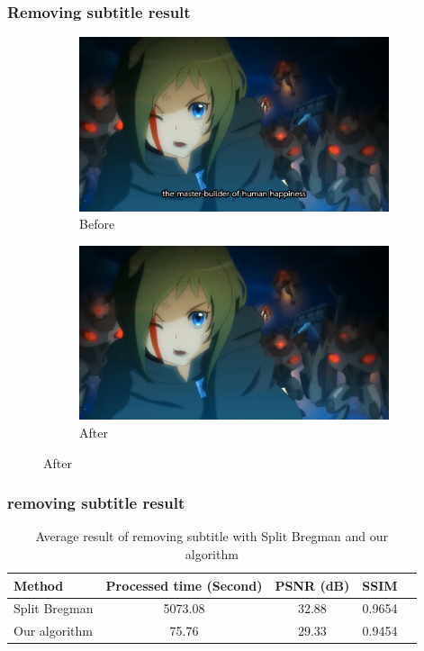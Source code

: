 \documentclass[xcolor=dvipsnames, xetex,serif]{beamer}
\begin{document}
    \begin{frame}
        \frametitle{Removing subtitle result}
        \begin{figure}[H]
            \centering
            \begin{subfigure}{0.4\linewidth}
                \centering
                \includegraphics[width=0.80\linewidth]{images/subtitle-remove/beforesubtitleremove.png}
                \caption{Before}
            \end{subfigure}
            \begin{subfigure}{0.4\linewidth}
                \centering
                \includegraphics[width=0.80\linewidth]{images/subtitle-remove/aftersubtitleremove.png}
                \caption{After}
            \end{subfigure}
        \end{figure}
    \end{frame}
    \begin{frame}
        \frametitle{removing subtitle result}
        \begin{table}[H]
            \centering
            \captionsetup{justification=centering}
            \begin{tabular}[ht]{|l|c|c|c|c|}
                \hline
                Method  & Processed time  (Second) & PSNR (dB) & SSIM \\
                \hline
                Split Bregman & 5073.08 & 32.88 & 0.9654 \\
                Our algorithm & 75.76 & 29.33 & 0.9454 \\
                \hline
            \end{tabular}
            \caption{
                Average result of removing subtitle with Split Bregman and our algorithm }
        \end{table}	
    \end{frame}
\end{document}
